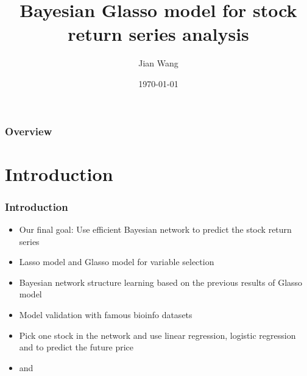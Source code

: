\documentclass{beamer}
\title[Bayesian-Glasso Model]{Bayesian Glasso model for stock return series analysis} %
\author{Jian Wang } %
\institute[Florida state university ] %
{Financial math Ph.D. candidate\\
\vspace{3ex}
Florida state university %
\medskip
\textit{jwang@math.fsu.edu} %
}
\date{\today} %
\begin{document}
\begin{frame}
\titlepage %
\end{frame}

\begin{frame}
\frametitle{Overview} %
\tableofcontents %
\end{frame}


\section{Introduction} %


\begin{frame}
\frametitle{Introduction}
\begin{itemize}
\item Our final goal: Use efficient {\color{red}Bayesian} network to predict the stock return series
\item {\color{red}Lasso} model and {\color{red}Glasso} model for variable selection
\item Bayesian network structure learning based on the previous results of Glasso model
\item Model validation with famous bioinfo datasets
\item Pick one stock in the network and use {\color{red}linear regression},{\color{red} logistic regression} and {\color{red}{support vector machine}} to predict the future price
\item {\color{red}{Parallel computing}} and {\color{red}{high frequency data}}
\end{itemize}


\end{frame}
\end{document}
